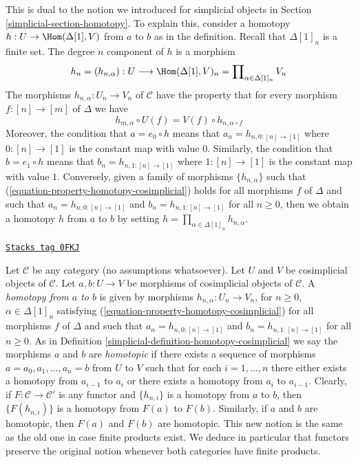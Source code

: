 This is dual to the notion we introduced for simplicial objects in
Section \ref{simplicial-section-homotopy}. To explain this, consider a
homotopy $h : U \to \Hom(\Delta[1], V)$ from $a$ to $b$ as
in the definition. Recall that $\Delta[1]_n$ is a finite
set. The degree $n$ component of $h$ is a morphism
$$
h_n = (h_{n, \alpha}) :
U
\longrightarrow
\Hom(\Delta[1], V)_n =
\prod\nolimits_{\alpha \in \Delta[1]_n} V_n
$$
The morphisms $h_{n, \alpha} : U_n \to V_n$ of $\mathcal{C}$ have the
property that for every morphism $f : [n] \to [m]$
of $\Delta$ we have
\begin{equation}
\label{equation-property-homotopy-cosimplicial}
h_{m, \alpha} \circ U(f) = V(f) \circ h_{n, \alpha \circ f}
\end{equation}
Moreover, the condition that $a = e_0 \circ h$ means that
$a_n = h_{n, 0 : [n] \to [1]}$ where $0 : [n] \to [1]$ is the
constant map with value $0$. Similarly, the condition that
$b = e_1 \circ h$ means that $b_n = h_{n, 1 : [n] \to [1]}$
where $1 : [n] \to [1]$ is the constant map with value $1$.
Conversely, given a family of morphisms $\{h_{n, \alpha}\}$
such that (\ref{equation-property-homotopy-cosimplicial})
holds for all morphisms $f$ of $\Delta$ and such that
$a_n = h_{n, 0 : [n] \to [1]}$ and $b_n = h_{n, 1 : [n] \to [1]}$
for all $n \geq 0$, then we obtain a homotopy $h$ from $a$ to $b$ by setting
$h = \prod_{\alpha \in \Delta[1]_n} h_{n, \alpha}$.

\begin{remark}
\label{simplicial-remark-homotopy-cosimplicial-better}
\href{https://stacks.math.columbia.edu/tag/0FKJ}{\texttt{Stacks tag 0FKJ}}

Let $\mathcal{C}$ be any category (no assumptions whatsoever). Let
$U$ and $V$ be cosimplicial objects of $\mathcal{C}$. Let $a, b : U \to V$
be morphisms of cosimplicial objects of $\mathcal{C}$. A
{\it homotopy from $a$ to $b$} is given by morphisms
$h_{n, \alpha} : U_n \to V_n$, for $n \geq 0$, $\alpha \in \Delta[1]_n$
satisfying (\ref{equation-property-homotopy-cosimplicial})
for all morphisms $f$ of $\Delta$ and such that
$a_n = h_{n, 0 : [n] \to [1]}$ and $b_n = h_{n, 1 : [n] \to [1]}$
for all $n \geq 0$.
As in Definition \ref{simplicial-definition-homotopy-cosimplicial}
we say the morphisms $a$ and $b$
are {\it homotopic} if there exists a sequence of morphisms
$a = a_0, a_1, \ldots, a_n = b$ from $U$ to $V$ such that for each
$i = 1, \ldots, n$ there either exists a homotopy from $a_{i - 1}$ to $a_i$
or there exists a homotopy from $a_i$ to $a_{i - 1}$.
Clearly, if $F : \mathcal{C} \to \mathcal{C}'$ is any functor
and $\{h_{n, i}\}$ is a homotopy from $a$ to $b$, then
$\{F(h_{n, i})\}$ is a homotopy from $F(a)$ to $F(b)$.
Similarly, if $a$ and $b$ are homotopic, then $F(a)$ and $F(b)$
are homotopic. This new notion is the same
as the old one in case finite products exist. We deduce
in particular that functors preserve the original notion
whenever both categories have finite products.
\end{remark}

